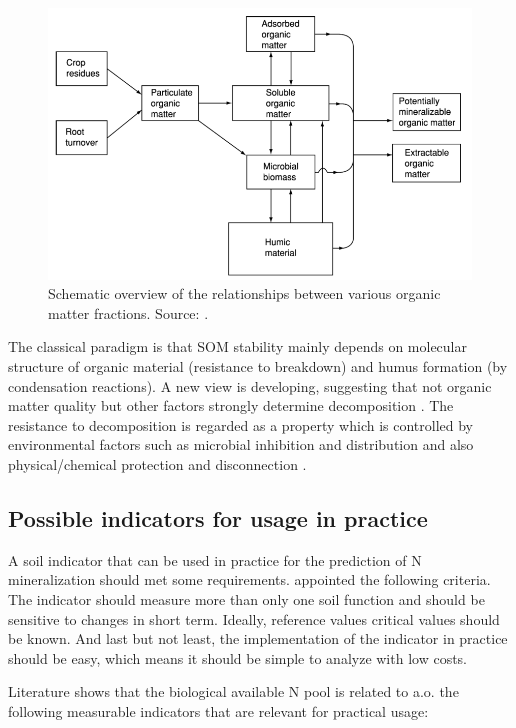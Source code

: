 \documentclass[10pt,twoside,dutch,english]{report}
\begin{document}
	\begin{figure}[h]
		\includegraphics[width=1\linewidth]{intro_haynes}
		\caption{Schematic overview of the relationships between various organic matter fractions. Source: \citet{Haynes2005}.}
		\label{fig:intro_haynes}
	\end{figure}

The classical paradigm is that SOM stability mainly depends on molecular structure of organic material (resistance to breakdown) and humus formation (by condensation reactions). A new view is developing, suggesting that not organic matter quality but other factors strongly determine decomposition \citep{bingham2015}. The resistance to decomposition is regarded as a property which is controlled by environmental factors such as microbial inhibition and distribution and also physical/chemical protection and disconnection \citep{Lutzow2006,Schmidt2011}.


\subsection{Possible indicators for usage in practice}
A soil indicator that can be used in practice for the prediction of N mineralization should met some requirements. \citet{Gil-Sotres2005} appointed the following criteria. The indicator should measure more than only one soil function and should be sensitive to changes in short term. Ideally, reference values  critical values should be known. And last but not least, the implementation of the indicator in practice should be easy, which means it should be simple to analyze with low costs. 

Literature shows that the biological available N pool is related to a.o. the following  measurable indicators that are relevant for practical usage:
\end{document}
